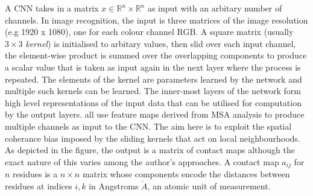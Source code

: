 A CNN takes in a matrix $x \in \mathbb{R}^n \times \mathbb{R}^n$ as input with an arbitary number of channels.
In image recognition, the input is three matrices of the image resolution (e.g 1920 x 1080), one for each
colour channel RGB. A square matrix (usually $3 \times 3$ \emph{kernel}) is initialised to arbitary values, then slid over each
input channel, the element-wise product is summed over the overlapping components to produce a scalar value that
is taken as input again in the next layer where the process is repeated. The elements of the kernel are parameters 
learned by the network and multiple such kernels can be learned. The inner-most layers of the network form high level
representations of the input data that can be utilised for computation by the output layers. \cite{Hou2019,Gao2019,Senior2020,Yang2020}
all use feature maps derived from MSA analysis to produce multiple channels as input to the CNN. The aim here 
is to exploit the spatial coherance bias imposed by the sliding kernels that act on local neighbourhoods. 
As depicted in the figure, the output is a matrix of contact maps although the exact nature of this varies among 
the author's approaches. A contact map $a_{ij}$ for $n$ residues is a $n \times n$ matrix whose components encode
the distances between residues at indices $i,k$ in Angstroms $\mathring{A}$, an atomic unit of measurement.
